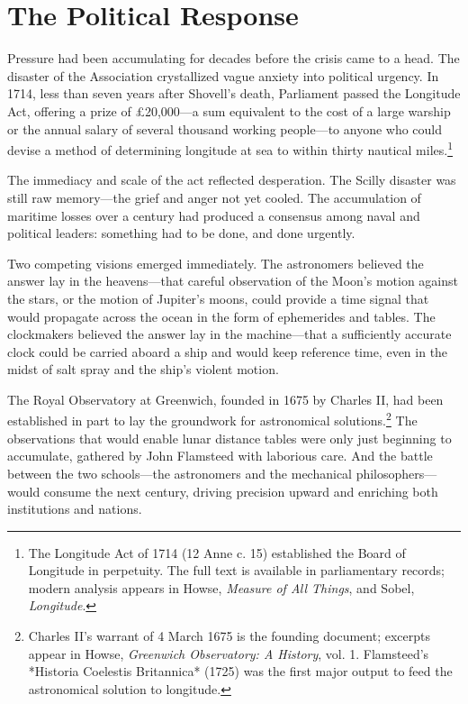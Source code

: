 \section{The Political Response}
\label{sec:longitude-act}

Pressure had been accumulating for decades before the crisis came to a head. The disaster of the Association crystallized vague anxiety into political urgency. In 1714, less than seven years after Shovell's death, Parliament passed the Longitude Act, offering a prize of \textsc{£20,000}---a sum equivalent to the cost of a large warship or the annual salary of several thousand working people---to anyone who could devise a method of determining longitude at sea to within thirty nautical miles.\footnote{The Longitude Act of 1714 (12 Anne c. 15) established the Board of Longitude in perpetuity. The full text is available in parliamentary records; modern analysis appears in Howse, \emph{Measure of All Things}, and Sobel, \emph{Longitude}.}

The immediacy and scale of the act reflected desperation. The Scilly disaster was still raw memory---the grief and anger not yet cooled. The accumulation of maritime losses over a century had produced a consensus among naval and political leaders: something had to be done, and done urgently.

Two competing visions emerged immediately. The astronomers believed the answer lay in the heavens---that careful observation of the Moon's motion against the stars, or the motion of Jupiter's moons, could provide a time signal that would propagate across the ocean in the form of ephemerides and tables. The clockmakers believed the answer lay in the machine---that a sufficiently accurate clock could be carried aboard a ship and would keep reference time, even in the midst of salt spray and the ship's violent motion.

The Royal Observatory at Greenwich, founded in 1675 by Charles II, had been established in part to lay the groundwork for astronomical solutions.\footnote{Charles II's warrant of 4 March 1675 is the founding document; excerpts appear in Howse, \emph{Greenwich Observatory: A History}, vol. 1. Flamsteed's *Historia Coelestis Britannica* (1725) was the first major output to feed the astronomical solution to longitude.} The observations that would enable lunar distance tables were only just beginning to accumulate, gathered by John Flamsteed with laborious care. And the battle between the two schools---the astronomers and the mechanical philosophers---would consume the next century, driving precision upward and enriching both institutions and nations.

